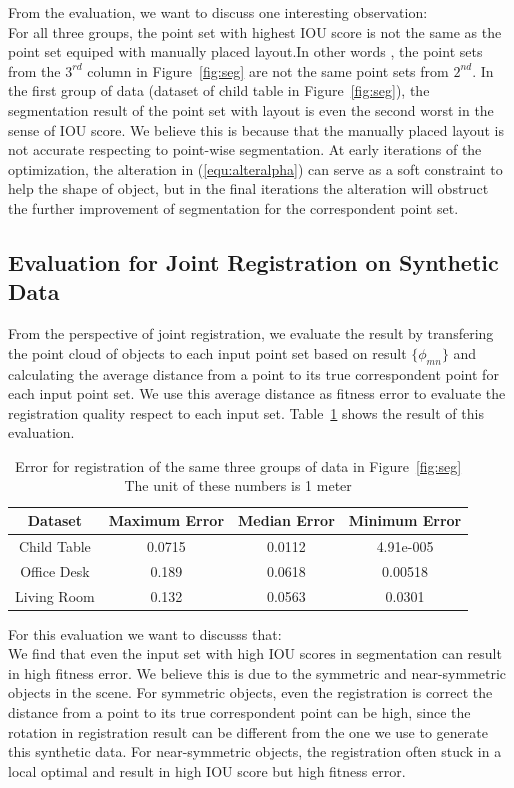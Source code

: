 From the evaluation, we want to discuss one interesting observation:\\
%
For all three groups, the point set with highest IOU score is not the same as the point set equiped with manually placed layout.In other words , the point sets from the $3^{rd}$ column in Figure~\ref{fig:seg} are not the same point sets from $2^{nd}$. In the first group of data (dataset of child table in Figure~\ref{fig:seg}), the segmentation result of the point set with layout is even the second worst in the sense of IOU score. We believe this is because that the manually placed layout is not accurate respecting to point-wise segmentation. At early iterations of the optimization, the alteration in (\ref{equ:alteralpha}) can serve as a soft constraint to help  the shape of object, but in the final iterations the alteration will obstruct the further improvement of segmentation for the correspondent point set. 



\subsection{Evaluation for Joint Registration on Synthetic Data}
From the perspective of joint registration, we evaluate the result by transfering  the point cloud of objects  to each input point set based on result $\{\phi_{mn}\}$ and calculating the average distance from a point to its true correspondent point for each input point set.  We use this average distance as fitness error to evaluate the registration quality respect to each input set.
Table~\ref{tab:regerror} shows the result of this evaluation.
\begin{table}
\centering
\begin{tabular}{c c c c}
Dataset & Maximum Error & Median Error & Minimum Error \\
\hline
Child Table & 0.0715 & 0.0112 & 4.91e-005 \\   
Office Desk & 0.189  & 0.0618 & 0.00518 \\
Living Room & 0.132  & 0.0563 & 0.0301\\
\end{tabular}
\caption{Error for registration of the same three groups of data in Figure~\ref{fig:seg} The unit of these numbers is 1 meter}
\label{tab:regerror}
\end{table}
For this evaluation we want to discusss  that:\\
We find that even the input set with high IOU scores in segmentation can result in high fitness error. We believe this is due to the symmetric and near-symmetric objects in the scene. For symmetric objects, even the registration is correct the distance from a point to its true correspondent point can be high, since the rotation in registration result can be different from the one we use to generate this synthetic data. For near-symmetric objects, the registration often stuck in a local optimal and result in high IOU score but high fitness error.
